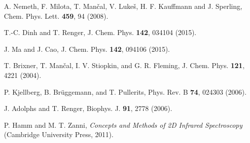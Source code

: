 \documentclass[%
 reprint,%
 amssymb, amsmath,%
 aip,cha,%
]{revtex4-1}
\begin{document}
\begin{thebibliography}{99}
 A. Nemeth, F. Milota, T. Man{\v c}al, V. Luke{\v s}, H. F. Kauffmann and J. Sperling, Chem. Phys. Lett. {\bf 459}, 94 (2008).

 T.-C. Dinh and T. Renger, J. Chem. Phys. {\bf 142}, 034104 (2015).

 J. Ma and J. Cao, J. Chem. Phys. {\bf 142}, 094106 (2015).

 T. Brixner, T. Man{\v c}al, I. V. Stiopkin, and G. R. Fleming, J. Chem. Phys. {\bf 121}, 4221 (2004).

 P. Kjellberg, B. Br{\" u}ggemann, and T. Pullerits, Phys. Rev. B {\bf 74}, 024303 (2006).

 J. Adolphs and T. Renger, Biophys. J. {\bf 91}, 2778 (2006).

 P. Hamm and M. T. Zanni, {\it Concepts and Methods of 2D Infrared Spectroscopy} (Cambridge University Press, 2011).

\end{thebibliography}
\end{document}
